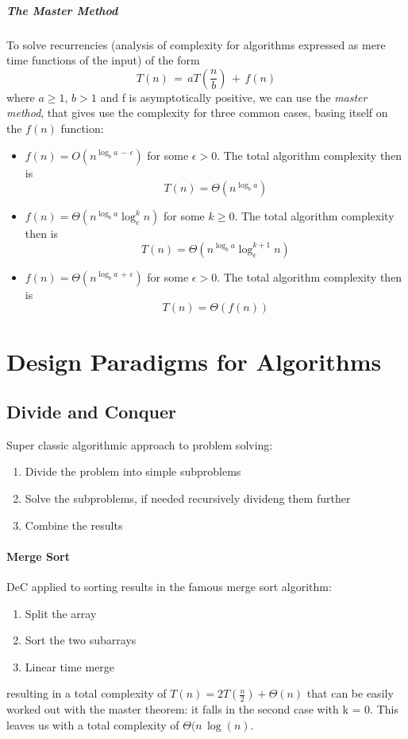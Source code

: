 \documentclass{article}
\begin{document}
			\subparagraph{The Master Method}
				To solve recurrencies (analysis of complexity for algorithms expressed as mere time functions of the input) of the form
				\begin{equation}
					T(n)\, =\, aT(\frac{n}{b})\, +\, f(n)
				\end{equation}
				where $a \geq 1$, $b > 1$ and f is asymptotically positive, we can use the \textit{master method}, that gives use the complexity for three common cases, basing itself on the $f(n)$ function:
				\begin{itemize}
					\item $f(n) = O(n^{\log_ba\, -\, \epsilon})$ for some $\epsilon > 0$. The total algorithm complexity then is
						\begin{equation}
							T(n) = \Theta(n^{\log_ba})
						\end{equation}
					\item $f(n) = \Theta(n^{\log_ba} \log_e^kn)$ for some $k \geq 0$. The total algorithm complexity then is
						\begin{equation}
							T(n) = \Theta(n^{\log_ba} \log_e^{k+1}n)
						\end{equation}
					\item $f(n) = \Theta(n^{\log_ba\, +\, \epsilon})$ for some $\epsilon > 0$. The total algorithm complexity then is
						\begin{equation}
							T(n) = \Theta(f(n))
						\end{equation}
				\end{itemize}

	\section{Design Paradigms for Algorithms}
		\subsection{Divide and Conquer}
			Super classic algorithmic approach to problem solving:
			\begin{enumerate}
				\item Divide the problem into simple subproblems
				\item Solve the subproblems, if needed recursively divideng them further
				\item Combine the results
			\end{enumerate}

			\paragraph{Merge Sort}
				DeC applied to sorting results in the famous merge sort algorithm:
				\begin{enumerate}
					\item Split the array
					\item Sort the two subarrays
					\item Linear time merge
				\end{enumerate}
				resulting in a total complexity of $T(n) = 2T(\frac{n}{2}) + \Theta(n)$ that can be easily worked out with the master theorem: it falls in the second case with k = 0. This leaves us with a total complexity of $\Theta(n\, \log(n)$.
\end{document}
